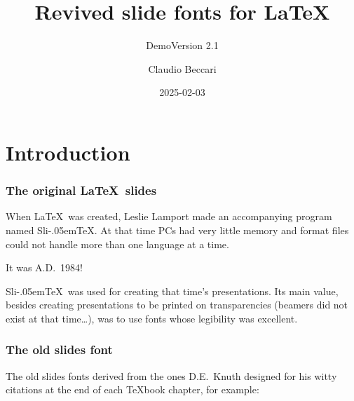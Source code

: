 \documentclass[usepdftitle=false]{beamer}\errorcontextlines=9
\title{Revived slide fonts for \LaTeX}
\subtitle{Demo\qquad Version 2.1}
\author{Claudio Beccari}
\date{2025-02-03}
\newcommand\SliTeX{Sli\kern-.05em\TeX}
\begin{document}


\begin{frame}
\titlepage
\end{frame}


\section{Introduction}

\begin{frame}\frametitle{The original \LaTeX\ slides}
When \LaTeX\ was created, Leslie Lamport made an accompanying program named \SliTeX. At that time PCs had very little memory and format files could not handle more than one language at a time.

\medskip

{\centering\alert{It was A.D.\ 1984!}\par}

\medskip

\SliTeX\ was used for creating that time's presentations. Its main value, besides creating presentations to be printed on transparencies (beamers did not exist at that time\dots), was to use fonts whose legibility was excellent.
\end{frame}

\begin{frame}\frametitle{The old slides font}
The old slides fonts derived from the ones D.E.\ Knuth designed for his witty citations at the end of each \TeX\-book chapter, for example:
\begin{quote}
\end{quote}
\end{frame}
\end{document}
